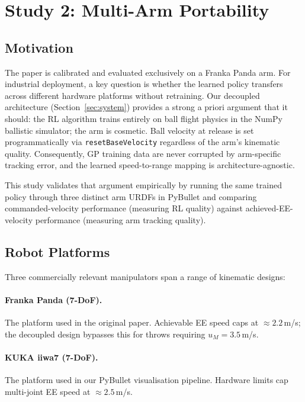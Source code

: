 \section{Study 2: Multi-Arm Portability}
\label{sec:study2}

\subsection{Motivation}
\label{sec:study2:motivation}

The \mcpilot{} paper is calibrated and evaluated exclusively on a Franka Panda arm.
For industrial deployment, a key question is whether the learned policy transfers across
different hardware platforms without retraining.
Our decoupled architecture (Section~\ref{sec:system}) provides a strong a priori
argument that it should: the RL algorithm trains entirely on ball flight physics in the
NumPy ballistic simulator; the arm is cosmetic.
Ball velocity at release is set programmatically via \texttt{resetBaseVelocity}
regardless of the arm's kinematic quality.
Consequently, GP training data are never corrupted by arm-specific tracking error, and
the learned speed-to-range mapping is architecture-agnostic.

This study validates that argument empirically by running the same trained policy
through three distinct arm URDFs in PyBullet and comparing commanded-velocity performance
(measuring RL quality) against achieved-EE-velocity performance (measuring arm tracking
quality).

\subsection{Robot Platforms}
\label{sec:study2:platforms}

Three commercially relevant manipulators span a range of kinematic designs:

\paragraph{Franka Panda (7-DoF).}
The platform used in the original \mcpilot{} paper.
Achievable EE speed caps at $\approx 2.2$\,m/s; the decoupled design bypasses this
for throws requiring $u_M = 3.5$\,m/s.

\paragraph{KUKA iiwa7 (7-DoF).}
The platform used in our PyBullet visualisation pipeline.
Hardware limits cap multi-joint EE speed at $\approx 2.5$\,m/s.


